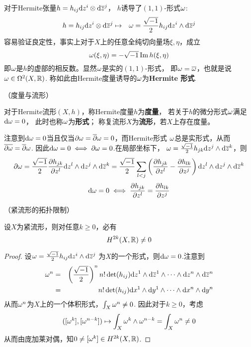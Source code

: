 对于Hermite张量$h=h_{ij}\mathrm{d} z^i\otimes \mathrm{d}\overline{z}^j$，
$h$诱导了$(1,1)$-形式$\omega$:
\begin{eqnarray*}
  h=h_{ij}\mathrm{d} z^i\otimes\mathrm{d}\overline{z}^j
&\mapsto&
  \omega=\frac{\sqrt{-1}}{2}
  h_{ij}\mathrm{d} z^i\wedge\mathrm{d}\overline{z}^j
\end{eqnarray*}
容易验证良定性，事实上对于$X$上的任意全纯切向量场$\xi,\eta$，成立
$$
  \omega(\xi,\eta)=-\sqrt{-1}\operatorname{Im} h(\xi,\eta)
$$
即$\omega$是$h$的虚部的相反数。显然$\omega$是实的$(1,1)$-形式，
即$\omega=\overline{\omega}$，也就是说$\omega\in\Omega^2(X,\mathbb{R})$.
称如此由Hermite度量诱导的$\omega$为\textbf{Hermite 形式}.

\begin{definition}（\Kahler 度量与\Kahler 流形）

对于Hermite流形$(X,h)$，称Hermite度量$h$为\textbf{\Kahler 度量}，
若关于$h$的微分形式$\omega$满足$\mathrm{d}\omega=0$，
此时也称$\omega$为\textbf{\Kahler 形式}；
称复流形$X$为\textbf{\Kahler 流形}，若$X$上存在\Kahler 度量。
\end{definition}


注意到$\mathrm{d}\omega=0$当且仅当$\partial\omega=\overline{\partial}\omega=0$，而Hermite形式
$\omega$总是实形式，从而$\overline{\partial\omega}=\overline{\partial}\omega$.
因此$\mathrm{d}\omega=0\iff\partial\omega=0$.在局部坐标下，
$\omega=\frac{\sqrt{-1}}{2}h_{jk}\mathrm{d} z^j\wedge\mathrm{d}\overline{z}^k$，则
$$
  \partial\omega
=
  \frac{\sqrt{-1}}{2}
  \frac{\partial h_{jk}} {\partial z^l}
    \mathrm{d} z^l\wedge\mathrm{d} z^j\wedge\mathrm{d}\overline{z}^k
=
  \frac{\sqrt{-1}}{2}
  \sum_{l<j}
    \left(
      \frac{\partial h_{jk}} {\partial z^l}
     -\frac{\partial h_{lk}} {\partial z^j}
    \right)
    \mathrm{d} z^l\wedge\mathrm{d} z^j\wedge\mathrm{d}\overline{z}^k
$$
$$
  \mathrm{d}\omega=0\iff
  \frac{\partial h_{jk}} {\partial z^l} = \frac{\partial h_{lk}} {\partial z^j}
$$

\begin{prop}（紧\Kahler 流形的拓扑限制）
\label{紧Kahler流形的拓扑限制-prop}

设$X$为紧\Kahler 流形，则对任意$k\geq 0$，必有
$$H^{2k}(X,\mathbb{R})\neq 0$$
\end{prop}

\begin{proof}
设$\omega=\frac{\sqrt{-1}}{2}h_{ij}\mathrm{d} z^i\wedge\mathrm{d}\overline{z}^j$
为$X$的一个\Kahler 形式，则$\mathrm{d}\omega=0$.注意到
\begin{eqnarray*}
     \omega^n
&=&
     \left(\frac{\sqrt{-1}}{2}\right)^n
     n!\det(h_{ij})
     \mathrm{d} z^1\wedge\mathrm{d}\overline{z}^1
     \wedge\cdots\wedge
     \mathrm{d} z^n\wedge\mathrm{d}\overline{z}^n\\
&=&
     n!\det(h_{ij})
     \mathrm{d} x^1\wedge\mathrm{d} y^1
     \wedge\cdots\wedge
     \mathrm{d} x^n\wedge\mathrm{d} y^n
\end{eqnarray*}
从而$\omega^n$为$X$上的一个体积形式，$\int_X\omega^n\neq 0$.
因此对于$k\geq 0$，考虑
$$
  ([\omega^k],[\omega^{n-k}])
\mapsto
  \int_X\omega^k\wedge\omega^{n-k}
=
  \int_X\omega^n\neq 0
$$
从而由庞加莱对偶，知$0\neq[\omega^k]\in H^{2k}(X,\mathbb{R})$.
\end{proof}

